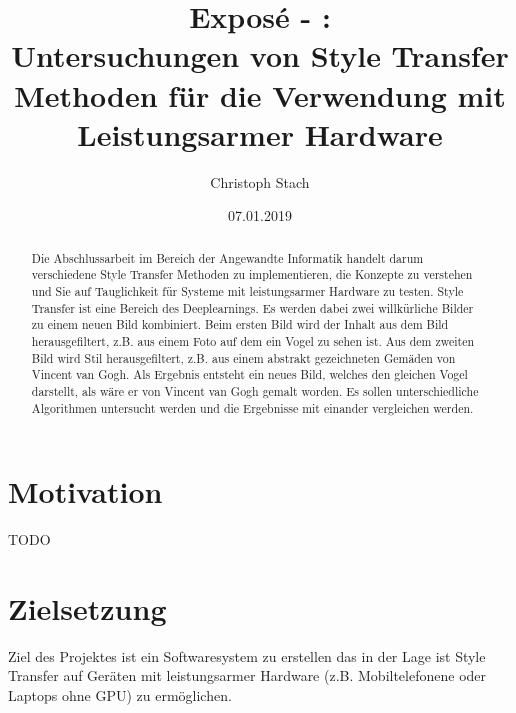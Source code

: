 


\title{\bf Exposé - \@exposeType:\protect\\ Untersuchungen von Style Transfer Methoden für die Verwendung mit Leistungsarmer Hardware}
\author{Christoph Stach}
\date{07.01.2019}



\maketitle

\begin{otherlanguage}{ngerman}
	\begin{abstract}
		Die Abschlussarbeit im Bereich der Angewandte Informatik handelt darum verschiedene Style Transfer Methoden zu implementieren,
		die Konzepte zu verstehen und Sie auf Tauglichkeit für Systeme mit leistungsarmer Hardware zu testen. Style Transfer ist eine Bereich des 
		Deeplearnings. Es werden dabei zwei willkürliche Bilder zu einem neuen Bild kombiniert. Beim ersten Bild wird der Inhalt aus dem Bild herausgefiltert,
		z.B. aus einem Foto auf dem ein Vogel zu sehen ist. Aus dem zweiten Bild wird Stil herausgefiltert, z.B. aus einem abstrakt gezeichneten Gemäden von Vincent van Gogh.
		Als Ergebnis entsteht ein neues Bild, welches den gleichen Vogel darstellt, als wäre er von Vincent van Gogh gemalt worden. 
		Es sollen unterschiedliche Algorithmen untersucht werden und die Ergebnisse mit einander vergleichen werden.
	\end{abstract}
\end{otherlanguage}

\section{Motivation}
TODO

\section{Zielsetzung}
Ziel des Projektes ist ein Softwaresystem zu erstellen das in der Lage ist
Style Transfer auf Geräten mit leistungsarmer Hardware (z.B. Mobiltelefonene oder Laptops ohne GPU) zu ermöglichen.

